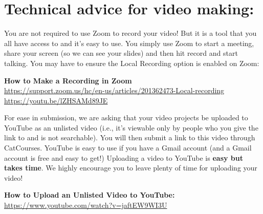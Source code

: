 \documentclass[11pt]{article}
\begin{document}
\section{Technical advice for video making:}

You are not required to use Zoom to record your video! But it is a tool that you all have access to and it's easy to use.
You simply use Zoom to start a meeting, share your screen (so we can see your slides) and then hit record and start talking. You may have to ensure the Local Recording option is enabled on Zoom: 
\begin{center}
\textbf{How to Make a Recording in Zoom}\\
\url{https://support.zoom.us/hc/en-us/articles/201362473-Local-recording}\\
\url{https://youtu.be/lZHSAMd89JE}
\end{center}

For ease in submission, we are asking that your video projects be uploaded to YouTube as an unlisted video (i.e., it's viewable only by people who you give the link to and is not searchable). You will then submit a link to this video through CatCourses.
YouTube is easy to use if you have a Gmail account (and a Gmail account is free and easy to get!)
Uploading a video to YouTube is \textbf{easy but takes time}. We highly encourage you to leave plenty of time for uploading your video!
\begin{center}
\textbf{How to Upload an Unlisted Video to YouTube:}\\
\url{https://www.youtube.com/watch?v=jaftEW9WI3U}
\end{center}
\end{document}
